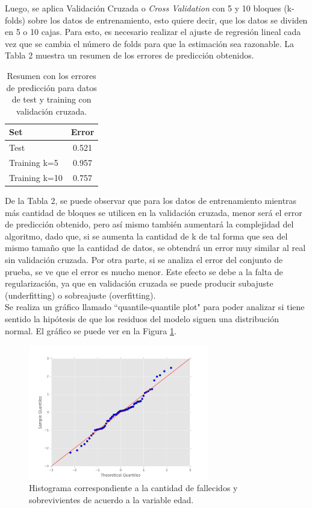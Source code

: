 \documentclass[letter, 10pt]{article}
\begin{document}
Luego, se aplica Validación Cruzada o \textit{Cross Validation} con 5 y 10 bloques (k-folds) sobre los datos de entrenamiento, esto quiere decir, que los datos se dividen en 5 o 10 cajas. Para esto, es necesario realizar el ajuste de regresión lineal cada vez que se cambia el número de folds para que la estimación sea razonable. La Tabla 2 muestra un resumen de los errores de predicción obtenidos.

\begin{table}[!hbt] 
\begin{center}
\begin{tabular}{| l | c |} 
\hline
\textbf{Set} & \textbf{Error}\\ 
\hline 
Test & 0.521\\ 
Training k=5 &0.957\\
Training k=10 &0.757\\
\hline 
\end{tabular}
\caption{Resumen con los errores de predicción para datos de test y training con validación cruzada.} 
\label{table:msecross}
\end{center} 
\end{table}

De la Tabla 2, se puede observar que para los datos de entrenamiento mientras más cantidad de bloques se utilicen en la validación cruzada, menor será el error de predicción obtenido, pero así mismo también aumentará la complejidad del algoritmo, dado que, si se aumenta la cantidad de k de tal forma que sea del mismo tamaño que la cantidad de datos, se obtendrá un error muy similar al real sin validación cruzada. Por otra parte, si se analiza el error del conjunto de prueba, se ve que el error es mucho menor. Este efecto se debe a la falta de regularización, ya que en validación cruzada se puede producir subajuste (underfitting) o sobreajuste (overfitting).\\

Se realiza un gráfico llamado ``quantile-quantile plot" para poder analizar si tiene sentido la hipótesis de que los residuos del modelo siguen una distribución normal. El gráfico se puede ver en la Figura \ref{qqplot}.

\begin{figure}[h]
\begin{center}
\includegraphics[width=0.7\textwidth]{Images/grafico1-j.png}
\caption{Histograma correspondiente a la cantidad de fallecidos y sobrevivientes de acuerdo a la variable edad.}
\label{qqplot}
\end{center}
\end{figure}
\end{document}
